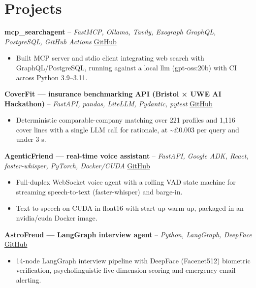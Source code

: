 \documentclass[a4paper,11pt]{article}
\begin{document}
\section{Projects}
\noindent\textbf{mcp\_searchagent} -- \textit{FastMCP, Ollama, Tavily, Exograph GraphQL, PostgreSQL, GitHub Actions} \hfill \href{https://github.com/Thiruvel-AP/mcp_searchagent}{GitHub}
\begin{itemize}
  \item Built MCP server and stdio client integrating web search with GraphQL/PostgreSQL, running against a local llm (gpt-oss:20b) with CI across Python 3.9–3.11.
\end{itemize}
\vspace{3pt}
\noindent\textbf{CoverFit — insurance benchmarking API (Bristol × UWE AI Hackathon)} -- \textit{FastAPI, pandas, LiteLLM, Pydantic, pytest} \hfill \href{https://github.com/Thiruvel-AP/AIHackathon-Phoenix}{GitHub}
\begin{itemize}
  \item Deterministic comparable-company matching over 221 profiles and 1,116 cover lines with a single LLM call for rationale, at \textasciitilde{}£0.003 per query and under 3 s.
\end{itemize}
\vspace{3pt}
\noindent\textbf{AgenticFriend — real-time voice assistant} -- \textit{FastAPI, Google ADK, React, faster-whisper, PyTorch, Docker/CUDA} \hfill \href{https://github.com/Thiruvel-AP/adk_multi-agent}{GitHub}
\begin{itemize}
  \item Full-duplex WebSocket voice agent with a rolling VAD state machine for streaming speech-to-text (faster-whisper) and barge-in.
  \item Text-to-speech on CUDA in float16 with start-up warm-up, packaged in an nvidia/cuda Docker image.
\end{itemize}
\vspace{3pt}
\noindent\textbf{AstroFreud — LangGraph interview agent} -- \textit{Python, LangGraph, DeepFace} \hfill \href{https://github.com/Thiruvel-AP/AstroFreud}{GitHub}
\begin{itemize}
  \item 14-node LangGraph interview pipeline with DeepFace (Facenet512) biometric verification, psycholinguistic five-dimension scoring and emergency email alerting.
\end{itemize}
\vspace{3pt}
\end{document}
